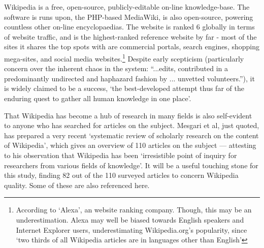 


Wikipedia is a free, open-source, publicly-editable on-line
knowledge-base. The software is runs upon, the PHP-based MediaWiki, is
also open-source, powering countless other on-line encyclopaedias. The
website is ranked 6 globally in terms of website traffic,
and is the highest-ranked reference website by far - most of the sites
it shares the top spots with are commercial portals, search engines,
shopping mega-sites, and social media websites.\footnote{According to
  `Alexa', an website ranking company.\cite{Alexa-about2014} Though,
  this may be an underestimation. Alexa may well be biased towards
  English speakers and Internet Explorer users, underestimating
  Wikipedia.org's popularity, since `two thirds of all Wikipedia
  articles are in languages other than
  English'\cite{wikimedia-noteonalexa}}\label{sec:popularity} Despite
early scepticism (particularly concern over the inherent chaos in the
system: ``...edits, contributed in a predominantly undirected and
haphazard fashion by ... unvetted volunteers.''\cite{Wilkinson2007}),
it is widely claimed to be a success, `the best-developed attempt thus
far of the enduring quest to gather all human knowledge in one
place'\cite{Mesgari2014}.

That Wikipedia has become a hub of research in many fields is also
self-evident to anyone who has searched for articles on the
subject. Mesgari et al, just quoted, has prepared a very recent
`systematic review of scholarly research on the content of Wikipedia',
which gives an overview of 110 articles on the subject --- attesting
to his observation that Wikipedia has been `irresistible point of
inquiry for researchers from various fields of knowledge'. It will be
a useful touching stone for this study, finding 82 out of the 110
surveyed articles to concern Wikipedia quality. Some of these are also
referenced here.

